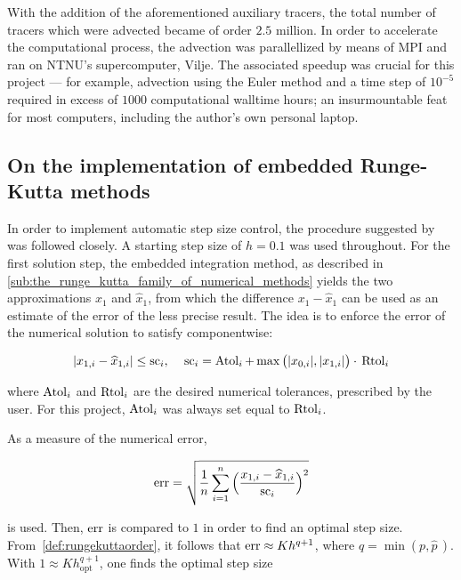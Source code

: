 With the addition of the aforementioned auxiliary tracers, the total number
of tracers which were advected became of order $2.5$ million. In order to
accelerate the computational process, the advection was parallellized by means
of MPI and ran on NTNU's supercomputer, Vilje. The associated speedup was
crucial for this project --- for example, advection using the Euler method
and a time step of $10^{-5}$ required in excess of $1000$ computational
walltime hours; an insurmountable feat for most computers, including the
author's own personal laptop.

\vspace{\fill}

\subsection{On the implementation of embedded Runge-Kutta methods}
\label{sub:on_the_implementation_of_embedded_runge_kutta_methods}

In order to implement automatic step size control, the procedure suggested
by \textcite[pp.167--168]{hairer1993solving} was followed
closely. A starting step size of $h=0.1$ was used throughout. For the first
solution step, the embedded integration method, as described in
\cref{sub:the_runge_kutta_family_of_numerical_methods} yields the two
approximations $x_{1}$ and $\widehat{x}_{1}$, from which the difference
$x_{1}-\widehat{x}_{1}$ can be used as an estimate of the error of the less
precise result. The idea is to enforce the error of the numerical solution to
satisfy componentwise:

\begin{equation}
    \label{eq:embeddederror}
    \abs{x_{1,i}-\widehat{x}_{1,i}} \leq \scem_{i},\quad{}%
    \scem_{i}=\atol_{i}+\max\big(\abs{x_{0,i}},\abs{x_{1,i}}\big)\cdot{}\rtol_{i}
\end{equation}

where $\operatorname{Atol}_{i}$ and $\operatorname{Rtol}_{i}$ are the desired numerical tolerances, prescribed
by the user. For this project, $\operatorname{Atol}_{i}$ was always set equal to $\operatorname{Rtol}_{i}$.

As a measure of the numerical error,

\begin{equation}
    \label{eq:embeddednumericalerror}
    \errem = \sqrt{\frac{1}{n}\sum\limits_{i=1}^{n}%
    \Big(\frac{x_{1,i}-\widehat{x}_{1,i}}{\scem_{i}}\Big)^{2}}
\end{equation}

is used. Then, $\operatorname{err}$ is compared to $1$ in order to find an optimal step
size. From~\cref{def:rungekuttaorder}, it follows that $\operatorname{err}\approx{}Kh^{q+1}$,
where $q=\min(p,\widehat{p}\,)$. With $1\approx{}Kh_{\mathrm{opt}}^{q+1}$,
one finds the optimal step size

